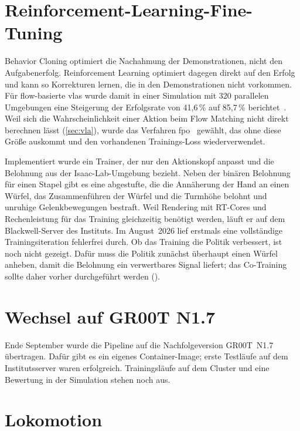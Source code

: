 \section{Reinforcement-Learning-Fine-Tuning}
\label{sec:rl-weiterfuehrend}
\label{sec:rl-verfahren}
\label{sec:rl-stand}

Behavior Cloning optimiert die Nachahmung der Demonstrationen, nicht den
Aufgabenerfolg. Reinforcement Learning optimiert dagegen direkt auf den Erfolg
und kann so Korrekturen lernen, die in den Demonstrationen nicht vorkommen.
Für flow-basierte \acp{vla} wurde damit in einer Simulation mit 320
parallelen Umgebungen eine Steigerung der Erfolgsrate von 41,6\,\% auf
85,7\,\% berichtet~\cite{pirl2025}. Weil sich die Wahrscheinlichkeit einer
Aktion beim Flow Matching nicht direkt berechnen lässt
(\cref{sec:vla}), wurde das Verfahren \ac{fpo}~\cite{fpo2025} gewählt, das
ohne diese Größe auskommt und den vorhandenen Trainings-Loss wiederverwendet.

Implementiert wurde ein Trainer, der nur den Aktionskopf anpasst und die
Belohnung aus der Isaac-Lab-Umgebung bezieht. Neben der binären Belohnung für
einen Stapel gibt es eine abgestufte, die die Annäherung der Hand an einen
Würfel, das Zusammenführen der Würfel und die Turmhöhe belohnt und unruhige
Gelenkbewegungen bestraft. Weil Rendering mit RT-Cores und Rechenleistung für das Training
gleichzeitig benötigt werden, läuft er auf dem Blackwell-Server des Instituts.
Im August~2026 lief erstmals eine vollständige Trainingsiteration
fehlerfrei durch. Ob das Training die Politik verbessert, ist noch nicht
gezeigt. Dafür muss die Politik zunächst überhaupt einen Würfel anheben, damit
die Belohnung ein verwertbares Signal liefert; das Co-Training sollte daher
vorher durchgeführt werden ().

\section{Wechsel auf GR00T N1.7}
\label{sec:n17}

Ende September wurde die Pipeline auf die Nachfolgeversion GR00T~N1.7
übertragen. Dafür gibt es ein eigenes Container-Image; erste Testläufe auf dem
Institutsserver waren erfolgreich. Trainingsläufe auf dem Cluster und eine
Bewertung in der Simulation stehen noch aus.

\section{Lokomotion}
\label{sec:locomotion}
\label{sec:loco-pfade}

